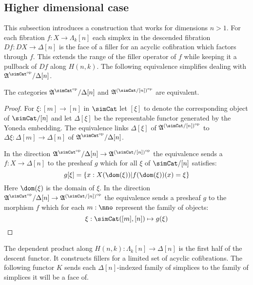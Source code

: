 \documentclass{tac}
\newcommand\hide[1]{}
\newcommand\set[1]{\left\{#1\right\}}
\newcommand\dual{^{\mathrm{op}}}
\newcommand\s{^{\simCat\dual}}
\newcommand\of{:}
\newcommand\simplex\Delta
\newcommand\horn\Lambda
\newcommand\ambient{\mathfrak A}
\begin{document}
\subsection{Higher dimensional case}
This subsection introduces a construction that works for dimensions $n>1$. For each fibration $f\of X\to \horn_k[n]$ each simplex in the descended fibration $Df\of DX\to \simplex[n]$ is the face of a filler for an acyclic cofibration which factors through $f$. This extends the range of the filler operator of $f$ while keeping it a pullback of $Df$ along $H(n,k)$. The following equivalence simplifies dealing with $\ambient\s/\simplex[n]$.

\hide{ this bit scares me. Has it actually gotten harder though? }
\begin{lemma} The categories $\ambient\s/\simplex[n]$ and $\ambient^{(\simCat/[n])\dual}$ are equivalent. \label{slice equivalence} \end{lemma}

\begin{proof} For $\xi\of[m]\to[n]$ in $\simCat$ let $[\xi]$ to denote the corresponding object of $\simCat/[n]$ and let $\simplex[\xi]$ be the representable functor generated by the Yoneda embedding. The equivalence links $\simplex[\xi]$ of $\ambient^{(\simCat/[n])\dual}$ to $\Delta\xi\of \simplex[m]\to \simplex[n]$ of $\ambient\s/\simplex[n]$.

In the direction $\ambient\s/\simplex[n]\to \ambient^{(\simCat/[n])\dual}$ the equivalence sends a $f\of X\to \simplex[n]$ to the presheaf $g$ which for all $\xi$ of $\simCat/[n]$ satisfies:
\[ g[\xi] = \set{ x\of X(\dom(\xi)) | f(\dom(\xi))(x)=\xi } \]
Here $\dom(\xi)$ is the domain of $\xi$.
In the direction $\ambient\s/\simplex[n]\to \ambient^{(\simCat/[n])\dual}$ the equivalence sends a presheaf $g$ to the morphism $f$ which for each $m\of\nno$ represent the family of objects:
\[ \xi\of\simCat([m],[n])\mapsto g(\xi) \]
\end{proof}


The dependent product along $H(n,k)\of \horn_k[n]\to\simplex[n]$ is the first half of the descent functor. It constructs fillers for a limited set of acyclic cofibrations. The following functor $K$ sends each $\simplex[n]$-indexed family of simplices to the family of simplices it will be a face of.
\end{document}
